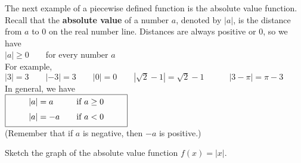 \documentclass{sebase}
\begin{document}
The next
example of a piecewise defined function is the absolute value function.
Recall that the \textbf{absolute value} of a number $a$, denoted by $%
\left\vert a\right\vert $, is the distance from $a$ to $0$ on the real
number line. Distances are always positive or $0$, so we have\\[6pt]
\hspace*{\fill}$\left\vert a\right\vert \geq 0\qquad $for every number $a$%
\hspace*{\fill}\\[6pt]
For example, \\[6pt]
\hspace*{\fill}$\left\vert 3\right\vert =3\qquad \left\vert -3\right\vert
=3\qquad \left\vert 0\right\vert =0\qquad \left\vert \sqrt{2}-1\right\vert =%
\sqrt{2}-1\qquad \quad \left\vert 3-\pi \right\vert =\pi -3$\hspace*{\fill}\\%
[6pt]
In general, we have \\[6pt]
\hspace*{\fill}$\fbox{$\qquad 
\begin{array}{lc}
\left\vert a\right\vert =a & \text{\quad if }a\geq 0\vspace{6pt} \\ 
\left\vert a\right\vert =-a & \text{\quad if }a<0\vspace{2pt}%
\end{array}%
\qquad $}$\hspace*{\fill}\\[6pt]
(Remember that if $a$ is
negative, then $-a$ is positive.)\vspace*{6pt}

\begin{Example}[8]
Sketch the graph of the absolute value function $f(x)=\left| x \right| $.
\end{Example}
\end{document}
